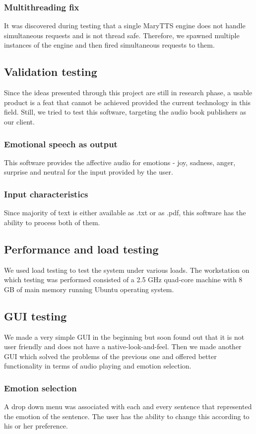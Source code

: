 \documentclass[oneside,a4paper,12pt]{book}
\begin{document}
\begin{appendices}
\subsubsection{Multithreading fix}
It was discovered during testing that a single MaryTTS engine does not handle simultaneous requests and is not thread safe. Therefore, we spawned multiple instances of the engine and then fired simultaneous requests to them.

\subsection{Validation testing}
Since the ideas presented through this project are still in research phase, a usable product is a feat that cannot be achieved provided the current technology in this field. Still, we tried to test this software, targeting the audio book publishers as our client.
\subsubsection{Emotional speech as output}
This software provides the affective audio for emotions - joy, sadness, anger, surprise and neutral for the input provided by the user.
\subsubsection{Input characteristics}
Since majority of text is either available as .txt or as .pdf, this software has the ability to process both of them.

\subsection{Performance and load testing}
We used load testing to test the system under various loads. The workstation on which testing was performed consisted of a 2.5 GHz quad-core machine with 8 GB of main memory running Ubuntu operating system.

\subsection{GUI testing}
We made a very simple GUI in the beginning but soon found out that it is not user friendly and does not have a native-look-and-feel. Then we made another GUI which solved the problems of the previous one and offered better functionality in terms of audio playing and emotion selection.
\subsubsection{Emotion selection}
A drop down menu was associated with each and every sentence that represented the emotion of the sentence. The user has the ability to change this according to his or her preference.

\end{appendices}
\end{document}
